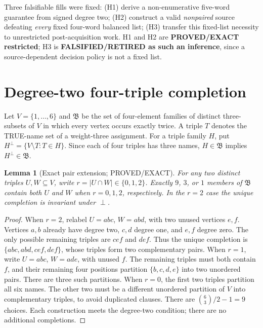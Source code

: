 \documentclass[11pt]{article}
\newtheorem{lemma}[theorem]{Lemma}
\begin{document}
Three falsifiable fills were fixed: (H1) derive a non-enumerative five-word guarantee from signed degree two; (H2) construct a valid \emph{nonpaired} source defeating \emph{every} fixed four-word balanced list; (H3) transfer this fixed-list necessity to unrestricted post-acquisition work. H1 and H2 are \textbf{PROVED/EXACT restricted}; H3 is \textbf{FALSIFIED/RETIRED as such an inference}, since a source-dependent decision policy is not a fixed list.

\section{Degree-two four-triple completion}
Let $V=\{1,\ldots,6\}$ and $\mathfrak B$ be the set of four-element families of distinct three-subsets of $V$ in which every vertex occurs exactly twice. A triple $T$ denotes the TRUE-name set of a weight-three assignment. For a triple family $H$, put $H^\perp=\{V\setminus T:T\in H\}$. Since each of four triples has three names, $H\in\mathfrak B$ implies $H^\perp\in\mathfrak B$.

\begin{lemma}[Exact pair extension; PROVED/EXACT]\label{lem:pair}
For any two distinct triples $U,W\subseteq V$, write $r=|U\cap W|\in\{0,1,2\}$. Exactly $9$, $3$, or $1$ members of $\mathfrak B$ contain both $U$ and $W$ when $r=0,1,2$, respectively. In the $r=2$ case the unique completion is invariant under $\perp$.
\end{lemma}
\begin{proof}
When $r=2$, relabel $U=abc$, $W=abd$, with two unused vertices $e,f$. Vertices $a,b$ already have degree two, $c,d$ degree one, and $e,f$ degree zero. The only possible remaining triples are $cef$ and $def$. Thus the unique completion is $\{abc,abd,cef,def\}$, whose triples form two complementary pairs.
When $r=1$, write $U=abc$, $W=ade$, with unused $f$. The remaining triples must both contain $f$, and their remaining four positions partition $\{b,c,d,e\}$ into two unordered pairs. There are three such partitions.
When $r=0$, the first two triples partition all six names. The other two must be a different unordered partition of $V$ into complementary triples, to avoid duplicated clauses. There are $\binom63/2-1=9$ choices. Each construction meets the degree-two condition; there are no additional completions.
\end{proof}
\end{document}
